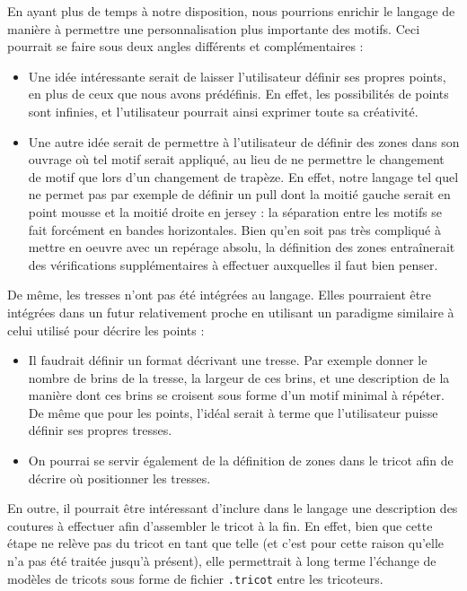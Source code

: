 \documentclass{article}
\begin{document}
En ayant plus de temps à notre disposition, nous pourrions enrichir le langage de manière à permettre une personnalisation plus importante des motifs. 
Ceci pourrait se faire sous deux angles différents et complémentaires :
\begin{itemize}
 \item Une idée intéressante serait de laisser l'utilisateur définir ses propres points, en plus de ceux que nous avons prédéfinis. En effet, les possibilités de points sont infinies, et l'utilisateur pourrait ainsi exprimer toute sa créativité.
 \item Une autre idée serait de permettre à l'utilisateur de définir des zones dans son ouvrage où tel motif serait appliqué, au lieu de ne permettre le changement de motif que lors d'un changement de trapèze. En effet, notre langage tel quel ne permet pas par exemple de définir un pull dont la moitié gauche serait en point mousse et la moitié droite en jersey : la séparation entre les motifs se fait forcément en bandes horizontales. Bien qu'en soit pas très compliqué à mettre en oeuvre avec un repérage absolu, la définition des zones entraînerait des vérifications supplémentaires à effectuer auxquelles il faut bien penser.\\
\end{itemize}

De même, les tresses n'ont pas été intégrées au langage. Elles pourraient être intégrées dans un futur relativement proche en utilisant un paradigme similaire à celui utilisé pour décrire les points :
\begin{itemize}
 \item Il faudrait définir un format décrivant une tresse. Par exemple donner le nombre de brins de la tresse, la largeur de ces brins, et une description de la manière dont ces brins se croisent sous forme d'un motif minimal à répéter. De même que pour les points, l'idéal serait à terme que l'utilisateur puisse définir ses propres tresses.
 \item On pourrai se servir également de la définition de zones dans le tricot afin de décrire où positionner les tresses. \\
\end{itemize}

En outre, il pourrait être intéressant d'inclure dans le langage une description des coutures à effectuer afin d'assembler le tricot à la fin. En effet, bien que cette étape ne relève pas du tricot en tant que telle (et c'est pour cette raison qu'elle n'a pas été traitée jusqu'à présent), elle permettrait à long terme l'échange de modèles de tricots sous forme de fichier \texttt{.tricot} entre les tricoteurs.
\end{document}
